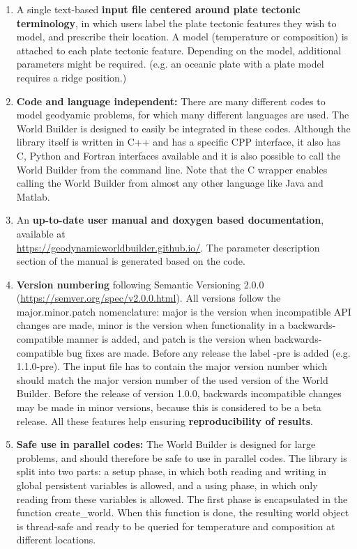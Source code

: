 \documentclass{book}
\newcommand{\WB}{{World Builder}}
\begin{document}
\begin{enumerate}
    \item A single text-based {\bf input file centered around plate tectonic terminology}, in which users label the plate tectonic features they wish to model, and prescribe their location. A model (temperature or composition) is attached to each plate tectonic feature. Depending on the model, additional parameters might be required. (e.g. an oceanic plate with a plate model requires a ridge position.) 
    \item {\bf Code and language independent:} There are many different codes to model geodyamic problems, for which many different languages are used. The \WB{} is designed to easily be integrated in these codes. Although the library itself is written in C++ and has a specific CPP interface, it also has C, Python and Fortran interfaces available and it is also possible to call the \WB{} from the command line. Note that the C wrapper enables calling the \WB{} from almost any other language like Java and Matlab. 
    \item An {\bf up-to-date user manual and doxygen based documentation}, available at \\ \url{https://geodynamicworldbuilder.github.io/}. The parameter description section of the manual is generated based on the code.

    \item {\bf Version numbering } following Semantic Versioning 2.0.0 (\url{https://semver.org/spec/v2.0.0.html}).
    All versions follow the major.minor.patch nomenclature: major is the version when incompatible API changes are made, minor is the version when functionality in a backwards-compatible manner is added, and patch is the version when backwards-compatible bug fixes are made. Before any release the label -pre is added (e.g. 1.1.0-pre). The input file has to contain the major version number which should match the major version number of the used version of the \WB{}. Before the release of version 1.0.0, backwards incompatible changes may be made in minor versions, because this is considered to be a beta release. All these features help ensuring {\bf reproducibility of results}.

    \item {\bf Safe use in parallel codes:} The \WB{} is designed for large problems, and should therefore be safe to use in parallel codes. The library is split into two parts: a setup phase, in which both reading and writing in global persistent variables is allowed, and a using phase, in which only reading from these variables is allowed. The first phase is encapsulated in the function create\_world. When this function is done, the resulting world object is thread-safe and ready to be queried for temperature and composition at different locations.
    

\end{enumerate}
\end{document}
